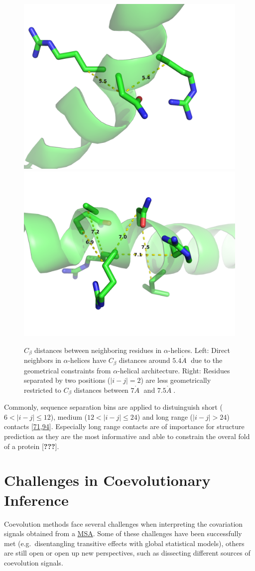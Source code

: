 \documentclass[12pt,a4paper,twoside]{book}
\newcommand{\Cb}{C_\beta}
\newcommand{\angstrom}{\mathring{A} \;}
\theoremstyle{definition}
\theoremstyle{definition}
\theoremstyle{remark}
\begin{document}
\begin{figure}

{\centering \includegraphics[width=0.4\linewidth]{img/dataset_statistics/cb_distribution_peak_5-6} \includegraphics[width=0.4\linewidth]{img/dataset_statistics/cb_distribution_peak_7} 

}

\caption{\(\Cb\) distances between
neighboring residues in \(\alpha\)-helices. Left: Direct neighbors in
\(\alpha\)-helices have \(\Cb\) distances around \(5.4\angstrom\) due to
the geometrical constraints from \(\alpha\)-helical architecture. Right:
Residues separated by two positions (\(|i-j| = 2\)) are less
geometrically restricted to \(\Cb\) distances between \(7\angstrom\) and
\(7.5\angstrom\).}\label{fig:peaks-Cb-distribution}
\end{figure}

Commonly, sequence separation bins are applied to distuinguish short
(\(6 < |i-j| \le 12\)), medium (\(12 < |i-j| \le 24\)) and long range
(\(|i-j| > 24\)) contacts
{[}\protect\hyperlink{ref-Monastyrskyy2015}{71},\protect\hyperlink{ref-Monastyrskyy2014a}{94}{]}.
Especially long range contacts are of importance for structure
prediction as they are the most informative and able to constrain the
overal fold of a protein {[}{\textbf{???}}{]}.

\section{Challenges in Coevolutionary Inference}\label{challenges}

Coevolution methods face several challenges when interpreting the
covariation signals obtained from a \protect\hyperlink{abbrev}{MSA}.
Some of these challenges have been successfully met (e.g.~disentangling
transitive effects with global statistical models), others are still
open or open up new perspectives, such as dissecting different sources
of coevolution signals.
\end{document}
